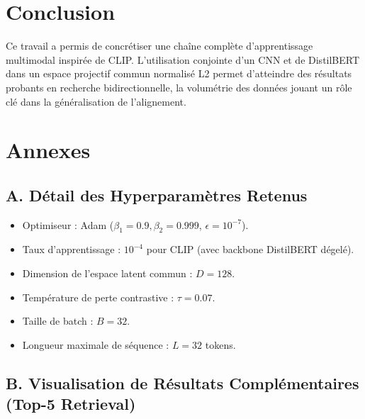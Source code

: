\documentclass[12pt,a4paper]{article}
\begin{document}
\section{Conclusion}
Ce travail a permis de concrétiser une chaîne complète d'apprentissage multimodal inspirée de CLIP. L'utilisation conjointe d'un CNN et de DistilBERT dans un espace projectif commun normalisé L2 permet d'atteindre des résultats probants en recherche bidirectionnelle, la volumétrie des données jouant un rôle clé dans la généralisation de l'alignement.

\newpage
\appendix
\section*{Annexes}

\subsection*{A. Détail des Hyperparamètres Retenus}
\begin{itemize}
    \item Optimiseur : Adam ($\beta_1 = 0.9, \beta_2 = 0.999$, $\epsilon = 10^{-7}$).
    \item Taux d'apprentissage : $10^{-4}$ pour CLIP (avec backbone DistilBERT dégelé).
    \item Dimension de l'espace latent commun : $D = 128$.
    \item Température de perte contrastive : $\tau = 0.07$.
    \item Taille de batch : $B = 32$.
    \item Longueur maximale de séquence : $L = 32$ tokens.
\end{itemize}

\subsection*{B. Visualisation de Résultats Complémentaires (Top-5 Retrieval)}
\end{document}
